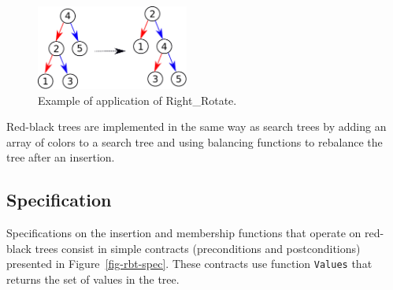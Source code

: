 \documentclass{llncs}
\begin{document}


\begin{figure}[ht]
\begin{center}
\includegraphics[width=5cm]{rotate_right.pdf}
\caption{\label{fig-search-rot} Example of application of Right\_Rotate.}
\end{center}
\end{figure}

Red-black trees are implemented in the same way as search trees by adding an
array of colors to a search tree and using balancing functions to rebalance the
tree after an insertion.

\subsection{Specification}

Specifications on the insertion and membership functions that operate on
red-black trees consist in simple contracts (preconditions and postconditions)
presented in Figure~\ref{fig-rbt-spec}. These contracts use function
\texttt{Values} that returns the set of values in the tree.

\end{document}
